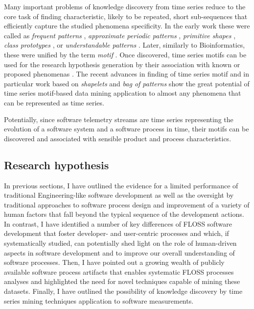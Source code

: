 Many important problems of knowledge discovery from time series reduce to the core task of finding 
characteristic, likely to be repeated, short sub-sequences that efficiently capture the studied 
phenomena specificity. In the early work these were called as 
\textit{frequent patterns} \cite{citeulike:5159615}, 
\textit{approximate periodic patterns} \cite{citeulike:1959582},
\textit{primitive shapes} \cite{citeulike:5898869}, 
\textit{class prototypes} \cite{citeulike:4406444}, 
or \textit{understandable patterns} \cite{citeulike:3978076}. 
Later, similarly to Bioinformatics, these were unified by the term \textit{motif} \cite{citeulike:3977965}.
Once discovered, time series motifs can be used for the research hypothesis generation by their association 
with known or proposed phenomenas \cite{citeulike:3977965}. 
The recent advances in finding of time series motif and in particular work based on \textit{shapelets} 
\cite{citeulike:7344347} \cite{citeulike:11957982} \cite{citeulike:12552293} and \textit{bag of patterns} 
\cite{citeulike:10525778} show the great potential of time series motif-based data mining application
to almost any phenomena that can be represented as time series.

Potentially, since software telemetry streams are time series representing the evolution of a software system 
and a software process in time, their motifs can be discovered and associated with sensible product and process characteristics.

%
%
\subsection{Research hypothesis}\label{section_research_hypothesis}
In previous sections, I have outlined the evidence for a limited performance of traditional Engineering-like 
software development as well as the oversight by traditional approaches to software process design and improvement
of a variety of human factors that fall beyond the typical sequence of the development actions.
In contrast, I have identified a number of key differences of FLOSS software development that 
foster developer- and user-centric processes and which, if systematically studied, can potentially shed light on 
the role of human-driven aspects in software development and to improve our overall understanding of 
software processes. 
Then, I have pointed out a growing wealth of publicly available software process artifacts that enables 
systematic FLOSS processes analyses and highlighted the need for novel techniques capable of mining these datasets.
Finally, I have outlined the possibility of knowledge discovery by time series mining techniques application 
to software measurements.

